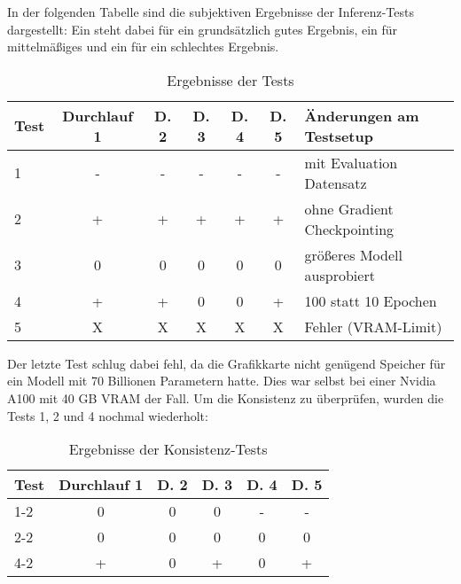 \documentclass[german,report]{i1thesis}
\begin{document}
In der folgenden Tabelle sind die subjektiven Ergebnisse der Inferenz-Tests dargestellt:
Ein \textquote{+} steht dabei für ein grundsätzlich gutes Ergebnis, ein  für mittelmäßiges und ein \textquote{-} für ein schlechtes Ergebnis.\\

\begin{table}[H]
    \centering
    \begin{tabular}{|l|c|c|c|c|c|l|}
        \hline
        \textbf{Test} & \textbf{Durchlauf 1} & \textbf{D. 2} & \textbf{D. 3} & \textbf{D. 4} & \textbf{D. 5} & \textbf{Änderungen am Testsetup} \\
        \hline
        1             & -                    & -             & -             & -             & -             & mit Evaluation Datensatz         \\
        \hline
        2             & +                    & +             & +             & +             & +             & ohne Gradient Checkpointing      \\
        \hline
        3             & 0                    & 0             & 0             & 0             & 0             & größeres Modell ausprobiert      \\
        \hline
        4             & +                    & +             & 0             & 0             & +             & 100 statt 10 Epochen             \\
        \hline
        5             & X                    & X             & X             & X             & X             & Fehler (\ac{VRAM}-Limit)         \\
        \hline
    \end{tabular}
    \caption{Ergebnisse der Tests}

\end{table}

Der letzte Test schlug dabei fehl, da die Grafikkarte nicht genügend Speicher für ein Modell mit 70 Billionen Parametern hatte.
Dies war selbst bei einer Nvidia A100 mit 40 \ac{GB} \ac{VRAM} der Fall.
Um die Konsistenz zu überprüfen, wurden die Tests 1, 2 und 4 nochmal wiederholt:


\begin{table}[H]
    \centering
    \begin{tabular}{|l|c|c|c|c|c|}
        \hline
        \textbf{Test} & \textbf{Durchlauf 1} & \textbf{D. 2} & \textbf{D. 3} & \textbf{D. 4} & \textbf{D. 5} \\
        \hline
        1-2           & 0                    & 0             & 0             & -             & -             \\
        \hline
        2-2           & 0                    & 0             & 0             & 0             & 0             \\
        \hline
        4-2           & +                    & 0             & +             & 0             & +             \\
        \hline
    \end{tabular}
    \caption{Ergebnisse der Konsistenz-Tests}
\end{table}
\end{document}
